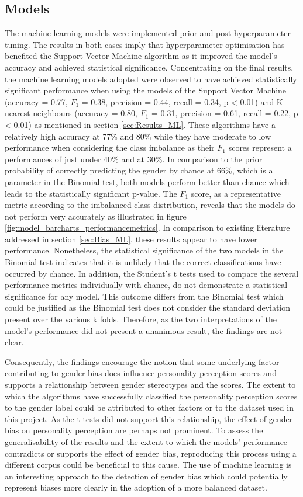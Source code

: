 \documentclass{l4proj}
\begin{document}
\subsection{Models}
The machine learning models were implemented prior and post hyperparameter tuning. The results in both cases imply that hyperparameter optimisation has benefited the Support Vector Machine algorithm as it improved the model's accuracy and achieved statistical significance. 
Concentrating on the final results, the machine learning models adopted were observed to have achieved statistically significant performance when using the models of the Support Vector Machine (accuracy = 0.77, $F_1$ = 0.38, precision = 0.44, recall = 0.34, p < 0.01) and K-nearest neighbours (accuracy = 0.80, $F_1$ = 0.31, precision = 0.61, recall = 0.22, p < 0.01) as mentioned in section \ref{sec:Results_ML}. These algorithms have a relatively high accuracy at 77\% and 80\% while they have moderate to low performance when considering the class imbalance as their $F_1$ scores represent a performances of just under 40\% and at 30\%. In comparison to the prior probability of correctly predicting the gender by chance at 66\%, which is a parameter in the Binomial test, both models perform better than chance which leads to the statistically significant p-value. The $F_1$ score, as a representative metric according to the imbalanced class distribution, reveals that the models do not perform very accurately as illustrated in figure \ref{fig:model_barcharts_performancemetrics}. In comparison to existing literature addressed in section \ref{sec:Bias_ML}, these results appear to have lower performance. Nonetheless, the statistical significance of the two models in the Binomial test indicates that it is unlikely that the correct classifications have occurred by chance.
In addition, the Student's t tests used to compare the several performance metrics individually with chance, do not demonstrate a statistical significance for any model. This outcome differs from the Binomial test which could be justified as the Binomial test does not consider the standard deviation present over the various k folds. Therefore, as the two interpretations of the model's performance did not present a unanimous result, the findings are not clear.

Consequently, the findings encourage the notion that some underlying factor contributing to gender bias does influence personality perception scores and supports a relationship between gender stereotypes and the scores. The extent to which the algorithms have successfully classified the personality perception scores to the gender label could be attributed to other factors or to the dataset used in this project. As the t-tests did not support this relationship, the effect of gender bias on personality perception are perhaps not prominent. To assess the generalisability of the results and the extent to which the models’ performance contradicts or supports the effect of gender bias, reproducing this process using a different corpus could be beneficial to this cause. 
The use of machine learning is an interesting approach to the detection of gender bias which could potentially represent biases more clearly in the adoption of a more balanced dataset.
\end{document}
